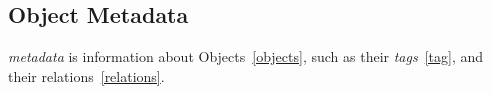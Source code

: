 \subsection{Object Metadata}
\label{object_metadata}

\emph{metadata} is information about Objects~\ref{objects}, such as their \emph{tags}~\ref{tag}, and their relations~\ref{relations}. 
